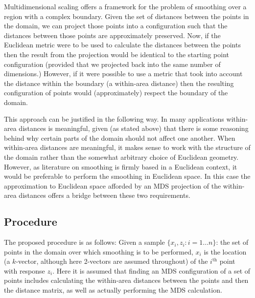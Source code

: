 \documentclass[a4paper,10pt]{article}
\begin{document}
Multidimensional scaling offers a framework for the problem of smoothing over a region with a complex boundary. Given the set of distances between the points in the domain, we can project those points into a configuration such that the distances between those points are approximately preserved. Now, if the Euclidean metric were to be used to calculate the distances between the points then the result from the projection would be identical to the starting point configuration (provided that we projected back into the same number of dimensions.) However, if it were possible to use a metric that took into account the distance within the boundary (a within-area distance) then the resulting configuration of points would (approximately) respect the boundary of the domain.

This approach can be justified in the following way. In many applications within-area distances is meaningful, given (as stated above) that there is some reasoning behind why certain parts of the domain should not affect one another. When within-area distances are meaningful, it makes sense to work with the structure of the domain rather than the somewhat arbitrary choice of Euclidean geometry. However, as literature on smoothing is firmly based in a Euclidean context, it would be preferable to perform the smoothing in Euclidean space. In this case the approximation to Euclidean space afforded by an MDS projection of the within-area distances offers a bridge between these two requirements.

\subsection{Procedure}

The proposed procedure is as follows: Given a sample $\{x_i, z_i : i=1\dots n\}$: the set of points in the domain over which smoothing is to be performed, $x_i$ is the location (a $k$-vector, although here 2-vectors are assumed throughout) of the $i^\text{th}$ point with response $z_i$. Here it is assumed that finding an MDS configuration of a set of points includes calculating the within-area distances between the points and then the distance matrix, as well as actually performing the MDS calculation.
\end{document}
